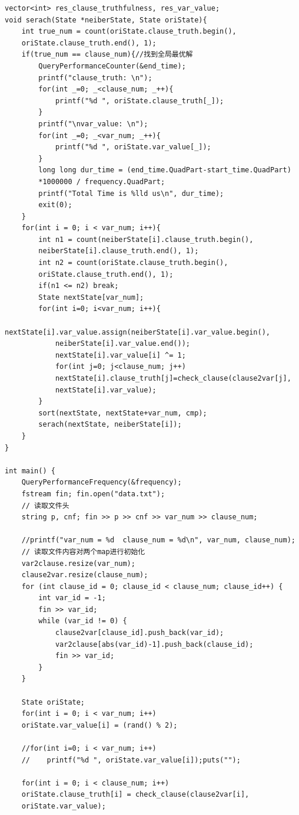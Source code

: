 \documentclass[UTF8]{ctexart}
\begin{document}
\begin{lstlisting}
vector<int> res_clause_truthfulness, res_var_value;
void serach(State *neiberState, State oriState){
    int true_num = count(oriState.clause_truth.begin(), 
    oriState.clause_truth.end(), 1);
    if(true_num == clause_num){//找到全局最优解
        QueryPerformanceCounter(&end_time);
        printf("clause_truth: \n");
        for(int _=0; _<clause_num; _++){
            printf("%d ", oriState.clause_truth[_]);
        }
        printf("\nvar_value: \n");
        for(int _=0; _<var_num; _++){
            printf("%d ", oriState.var_value[_]);
        }
        long long dur_time = (end_time.QuadPart-start_time.QuadPart)
        *1000000 / frequency.QuadPart;
        printf("Total Time is %lld us\n", dur_time);
        exit(0);
    }
    for(int i = 0; i < var_num; i++){
        int n1 = count(neiberState[i].clause_truth.begin(), 
        neiberState[i].clause_truth.end(), 1);
        int n2 = count(oriState.clause_truth.begin(), 
        oriState.clause_truth.end(), 1);
        if(n1 <= n2) break;
        State nextState[var_num];
        for(int i=0; i<var_num; i++){
            nextState[i].var_value.assign(neiberState[i].var_value.begin(), 
            neiberState[i].var_value.end());
            nextState[i].var_value[i] ^= 1;
            for(int j=0; j<clause_num; j++)
            nextState[i].clause_truth[j]=check_clause(clause2var[j], 
            nextState[i].var_value);
        }
        sort(nextState, nextState+var_num, cmp);
        serach(nextState, neiberState[i]);
    }
}

int main() {
    QueryPerformanceFrequency(&frequency);
    fstream fin; fin.open("data.txt");
    // 读取文件头
    string p, cnf; fin >> p >> cnf >> var_num >> clause_num;
    
    //printf("var_num = %d  clause_num = %d\n", var_num, clause_num);
    // 读取文件内容对两个map进行初始化
    var2clause.resize(var_num);
    clause2var.resize(clause_num);
    for (int clause_id = 0; clause_id < clause_num; clause_id++) {
        int var_id = -1;
        fin >> var_id;
        while (var_id != 0) {
            clause2var[clause_id].push_back(var_id);
            var2clause[abs(var_id)-1].push_back(clause_id);
            fin >> var_id;
        }
    }
    
    State oriState;
    for(int i = 0; i < var_num; i++) 
    oriState.var_value[i] = (rand() % 2);
    
    //for(int i=0; i < var_num; i++) 
    //    printf("%d ", oriState.var_value[i]);puts("");
    
    for(int i = 0; i < clause_num; i++) 
    oriState.clause_truth[i] = check_clause(clause2var[i], 
    oriState.var_value);
    

\end{lstlisting}
\end{document}
